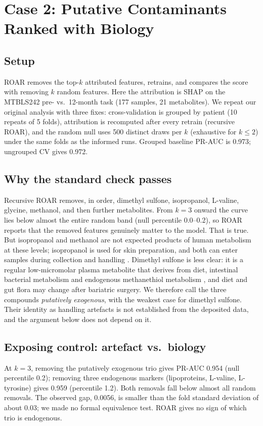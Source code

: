\documentclass[conference]{IEEEtran}
\newcommand{\verified}[1]{#1}  %
\begin{document}
\section{Case 2: Putative Contaminants Ranked with Biology}
\label{sec:case2}

\subsection{Setup}
ROAR \cite{hooker2019} removes the top-$k$ attributed features, retrains, and
compares the score with removing $k$ random features. Here the attribution is
SHAP on the MTBLS242 pre- vs.\ 12-month task (177 samples, 21 metabolites).
We repeat our original analysis with three fixes: cross-validation is grouped
by patient (10 repeats of 5 folds), attribution is recomputed after every
retrain (recursive ROAR), and the random null uses 500 distinct draws per $k$
(exhaustive for $k\leq 2$) under the same folds as the informed runs.
Grouped baseline PR-AUC is \verified{0.973}; ungrouped CV gives
\verified{0.972}.

\subsection{Why the standard check passes}
Recursive ROAR removes, in order, dimethyl sulfone, isopropanol, L-valine,
glycine, methanol, and then further metabolites. From $k=3$ onward the
curve lies below almost the entire random band (null percentile
\verified{0.0--0.2}), so ROAR reports that the removed features genuinely
matter to the model. That is true. But isopropanol and methanol are not
expected products of human metabolism at these levels; isopropanol is used
for skin preparation, and both can enter samples during collection and
handling \cite{bernini2011, vandersar2015}. Dimethyl sulfone is less clear:
it is a regular low-micromolar plasma metabolite that derives from diet,
intestinal bacterial metabolism and endogenous methanethiol metabolism
\cite{engelke2005}, and diet and gut flora may change after bariatric surgery.
We therefore call the three compounds \emph{putatively exogenous}, with the
weakest case for dimethyl sulfone. Their identity as handling artefacts is not
established from the deposited data, and the argument below does not depend
on it.

\subsection{Exposing control: artefact vs.\ biology}
At $k=3$, removing the putatively exogenous trio gives PR-AUC
\verified{0.954} (null percentile \verified{0.2}); removing three endogenous
markers (lipoproteins, L-valine, L-tyrosine) gives \verified{0.959}
(percentile \verified{1.2}). Both removals fall below almost all random
removals. The observed gap, \verified{0.0056}, is smaller than the fold
standard deviation of about \verified{0.03}; we made no formal equivalence
test. ROAR gives no sign of which trio is endogenous.
\end{document}
